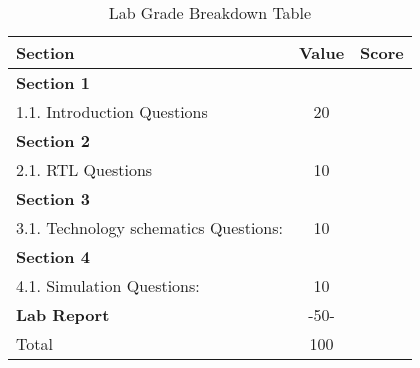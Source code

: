 \documentclass{article}
\begin{document}
\begin{table}[!htb]
  \begin{center}
    \begin{tabular}[width=0.8\textwidth]{|l|c|l|}
       \hline
       Section & Value & Score\\
       \hline 
       \multicolumn{2}{|l}{\textbf{Section 1}} &\\
       \hline
       1.1. Introduction Questions & 20 &\\
       \hline
       \multicolumn{2}{|l}{\textbf{Section 2}}  &\\
       \hline
       2.1. RTL Questions & 10 &\\
       \hline
       \multicolumn{2}{|l}{\textbf{Section 3}}  &\\
       \hline
       3.1. Technology schematics Questions: & 10 &\\
       \hline
       \multicolumn{2}{|l}{\textbf{Section 4}}  &\\
       \hline
       4.1. Simulation Questions: & 10 &\\
       \hline
       \multicolumn{1}{|l}{\textbf{Lab Report}}  & -50- &\\
       \hline
       \hline
       \multicolumn{1}{|l}{Total} & \multicolumn{1}{c|}{100} &\\
       \hline
    \end{tabular}
  \end{center}
  \caption{Lab Grade Breakdown Table}
\end{table}
\end{document}
